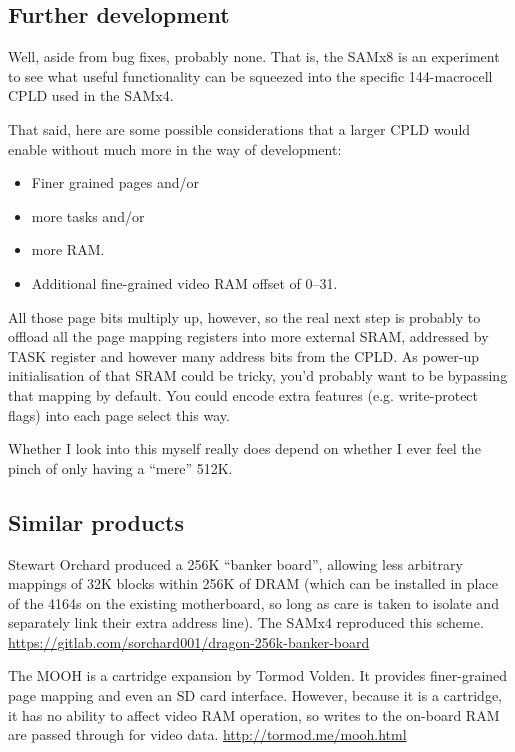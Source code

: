 \documentclass[12pt]{article}
\begin{document}
\subsection*{Further development}

Well, aside from bug fixes, probably none.  That is, the SAMx8 is an experiment
to see what useful functionality can be squeezed into the specific 144-macrocell
CPLD used in the SAMx4.

That said, here are some possible considerations that a larger CPLD would
enable without much more in the way of development:

\begin{itemize}
\item Finer grained pages and/or
\item more tasks and/or
\item more RAM.
\item Additional fine-grained video RAM offset of 0--31.
\end{itemize}

All those page bits multiply up, however, so the real next step is probably to
offload all the page mapping registers into more external SRAM, addressed by
TASK register and however many address bits from the CPLD.  As power-up
initialisation of that SRAM could be tricky, you'd probably want to be
bypassing that mapping by default.  You could encode extra features (e.g.
write-protect flags) into each page select this way.

Whether I look into this myself really does depend on whether I ever feel the
pinch of only having a ``mere'' 512K.


\newpage
\subsection*{Similar products}

Stewart Orchard produced a 256K ``banker board'', allowing less arbitrary
mappings of 32K blocks within 256K of DRAM (which can be installed in place of
the 4164s on the existing motherboard, so long as care is taken to isolate and
separately link their extra address line).  The SAMx4 reproduced this scheme.
\href{https://gitlab.com/sorchard001/dragon-256k-banker-board}{https://gitlab.com/sorchard001/dragon-256k-banker-board}

The MOOH is a cartridge expansion by Tormod Volden.  It provides finer-grained
page mapping and even an SD card interface.  However, because it is a
cartridge, it has no ability to affect video RAM operation, so writes to the
on-board RAM are passed through for video data.
\href{http://tormod.me/mooh.html}{http://tormod.me/mooh.html}
\end{document}
